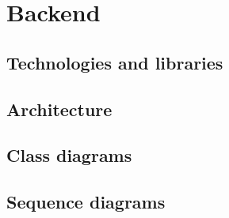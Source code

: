 \section{Backend}
\subsection{Technologies and libraries}
\subsection{Architecture}
\subsection{Class diagrams}
\subsection{Sequence diagrams}